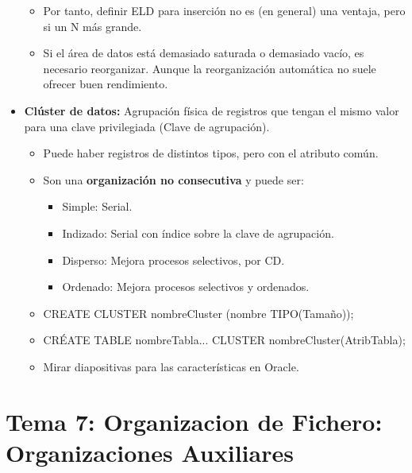 \documentclass[12pt, twoside, openright]{report} %
\begin{document}
\begin{itemize}
\begin{itemize}
      \item Por tanto, definir ELD para inserción no es (en general) una
        ventaja, pero si un N más grande.
        
      \item Si el área de datos está demasiado saturada o demasiado vacío,
        es necesario reorganizar. Aunque la reorganización automática no
        suele ofrecer buen rendimiento.
        
      \end{itemize}
    \item \textbf{Clúster de datos:} Agrupación física de registros que
      tengan el mismo valor para una clave privilegiada (Clave de
      agrupación).
      

      \begin{itemize}
      \item Puede haber registros de distintos tipos, pero con el atributo
        común.
        
      \item Son una \textbf{organización no consecutiva} y puede ser:
        

        \begin{itemize}
        \item Simple: Serial.
          
        \item Indizado: Serial con índice sobre la clave de agrupación.
          
        \item Disperso: Mejora procesos selectivos, por CD.
          
        \item Ordenado: Mejora procesos selectivos y ordenados.
          
        \end{itemize}
      \item CREATE CLUSTER nombreCluster (nombre TIPO(Tamaño));
        
      \item CRÉATE TABLE nombreTabla... CLUSTER nombreCluster(AtribTabla);
        
      \item Mirar diapositivas para las características en Oracle.
        
      \end{itemize}
    \end{itemize}

  
\chapter{Tema 7: Organizacion de Fichero: Organizaciones Auxiliares}
\end{document}
